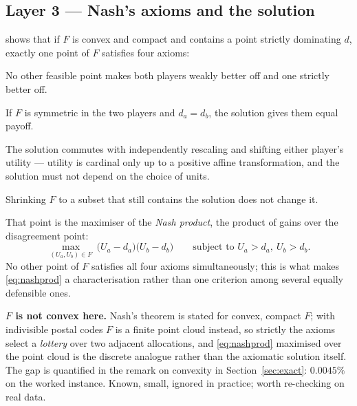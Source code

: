 \documentclass[11pt]{article}
\theoremstyle{remark}\newtheorem*{remark}{Remark}
\begin{document}
\subsection{Layer 3 --- Nash's axioms and the solution}
\citet{nash1950} shows that if $F$ is convex and compact and contains a point strictly
dominating $d$, exactly one point of $F$ satisfies four axioms:
\begin{description}[leftmargin=1.6em,itemsep=1pt]
\item[Pareto optimality.] No other feasible point makes both players weakly better off
  and one strictly better off.
\item[Symmetry.] If $F$ is symmetric in the two players and $d_a=d_b$, the solution gives
  them equal payoff.
\item[Invariance to affine transformations.] The solution commutes with independently
  rescaling and shifting either player's utility --- utility is cardinal only up to a
  positive affine transformation, and the solution must not depend on the choice of
  units.
\item[Independence of irrelevant alternatives.] Shrinking $F$ to a subset that still
  contains the solution does not change it.
\end{description}
That point is the maximiser of the \emph{Nash product}, the product of gains over the
disagreement point:
\begin{equation}\label{eq:nashprod}
\max_{(U_a,U_b)\in F}\ \bigl(U_a-d_a\bigr)\bigl(U_b-d_b\bigr)
\qquad\text{subject to } U_a>d_a,\ U_b>d_b .
\end{equation}
No other point of $F$ satisfies all four axioms simultaneously; this is what makes
\eqref{eq:nashprod} a characterisation rather than one criterion among several equally
defensible ones.

\begin{warnbox}
\textbf{$F$ is not convex here.} Nash's theorem is stated for convex, compact $F$; with
indivisible postal codes $F$ is a finite point cloud instead, so strictly the axioms
select a \emph{lottery} over two adjacent allocations, and \eqref{eq:nashprod} maximised
over the point cloud is the discrete analogue rather than the axiomatic solution itself.
The gap is quantified in the remark on convexity in Section~\ref{sec:exact}: $0.0045\%$
on the worked instance. Known, small, ignored in practice; worth re-checking on real
data.
\end{warnbox}
\end{document}
